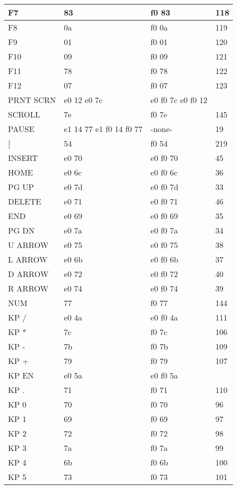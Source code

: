 \begin{longtable}{| p{} | p{} | p{} | p{} |}
  F7 & 83 & f0 83 & 118 \\ \hline
  F8 & 0a & f0 0a & 119 \\ \hline
  F9 & 01 & f0 01 & 120 \\ \hline
  F10 & 09 & f0 09 & 121 \\ \hline
  F11 & 78 & f0 78 & 122 \\ \hline
  F12 & 07 & f0 07 & 123 \\ \hline
  PRNT SCRN & e0 12 e0 7c & e0 f0 7c e0 f0 12 &  \\ \hline
  SCROLL & 7e & f0 7e & 145 \\ \hline
  PAUSE & e1 14 77 e1 f0 14 f0 77 & -none- & 19 \\ \hline
  [ & 54 & f0 54 & 219 \\ \hline
  INSERT & e0 70 & e0 f0 70 & 45 \\ \hline
  HOME & e0 6c & e0 f0 6c & 36 \\ \hline
  PG UP & e0 7d & e0 f0 7d & 33 \\ \hline
  DELETE & e0 71 & e0 f0 71 & 46 \\ \hline
  END & e0 69 & e0 f0 69 & 35 \\ \hline
  PG DN & e0 7a & e0 f0 7a & 34 \\ \hline
  U ARROW & e0 75 & e0 f0 75 & 38 \\ \hline
  L ARROW & e0 6b & e0 f0 6b & 37 \\ \hline
  D ARROW & e0 72 & e0 f0 72 & 40 \\ \hline
  R ARROW & e0 74 & e0 f0 74 & 39 \\ \hline
  NUM & 77 & f0 77 & 144 \\ \hline
  KP / & e0 4a & e0 f0 4a & 111 \\ \hline
  KP * & 7c & f0 7c & 106 \\ \hline
  KP - & 7b & f0 7b & 109 \\ \hline
  KP + & 79 & f0 79 & 107 \\ \hline
  KP EN & e0 5a & e0 f0 5a &  \\ \hline
  KP . & 71 & f0 71 & 110 \\ \hline
  KP 0 & 70 & f0 70 & 96 \\ \hline
  KP 1 & 69 & f0 69 & 97 \\ \hline
  KP 2 & 72 & f0 72 & 98 \\ \hline
  KP 3 & 7a & f0 7a & 99 \\ \hline
  KP 4 & 6b & f0 6b & 100 \\ \hline
  KP 5 & 73 & f0 73 & 101 \\ \hline

\end{longtable}

